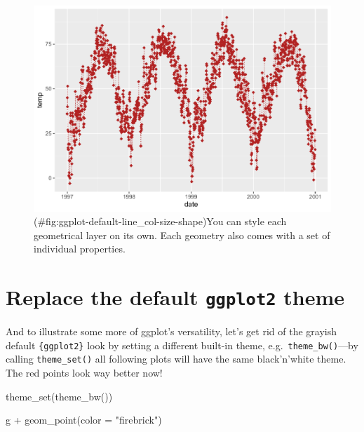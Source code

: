 \documentclass[
]{krantz}
\makeatletter
\newenvironment{Shaded}{\begin{snugshade}}{\end{snugshade}}
\newcommand{\AttributeTok}[1]{\textcolor[rgb]{0.61,0.61,0.61}{#1}}
\newcommand{\FunctionTok}[1]{\textcolor[rgb]{0,0,0}{#1}}
\newcommand{\NormalTok}[1]{#1}
\newcommand{\SpecialCharTok}[1]{\textcolor[rgb]{0,0,0}{#1}}
\newcommand{\StringTok}[1]{\textcolor[rgb]{0.5,0.5,0.5}{#1}}
\newenvironment{kframe}{%
\medskip{}
\setlength{\fboxsep}{.8em}
 \def\at@end@of@kframe{}%
 \ifinner\ifhmode%
  \def\at@end@of@kframe{\end{minipage}}%
  \begin{minipage}{\columnwidth}%
 \fi\fi%
 \def\FrameCommand##1{\hskip\@totalleftmargin \hskip-\fboxsep
 \colorbox{shadecolor}{##1}\hskip-\fboxsep
     \hskip-\linewidth \hskip-\@totalleftmargin \hskip\columnwidth}%
 \MakeFramed {\advance\hsize-\width
   \@totalleftmargin\z@ \linewidth\hsize
   \@setminipage}}%
 {\par\unskip\endMakeFramed%
 \at@end@of@kframe}
\renewenvironment{Shaded}{\begin{kframe}}{\end{kframe}}
\makeatother
\begin{document}
\begin{figure}
\centering
\includegraphics{bookdown_files/figure-latex/ggplot-default-line_col-size-shape-1.pdf}
\caption{(\#fig:ggplot-default-line\_col-size-shape)You can style each geometrical layer on its own. Each geometry also comes with a set of individual properties.}
\end{figure}

\hypertarget{theme}{%
\section{\texorpdfstring{Replace the default \texttt{ggplot2} theme}{Replace the default ggplot2 theme}}\label{theme}}

And to illustrate some more of ggplot's versatility, let's get rid of the grayish default \texttt{\{ggplot2\}} look by setting a different built-in theme, e.g.~\texttt{theme\_bw()}---by calling \texttt{theme\_set()} all following plots will have the same black'n'white theme. The red points look way better now!

\begin{Shaded}
\begin{Highlighting}[]
\FunctionTok{theme\_set}\NormalTok{(}\FunctionTok{theme\_bw}\NormalTok{())}

\NormalTok{g }\SpecialCharTok{+} \FunctionTok{geom\_point}\NormalTok{(}\AttributeTok{color =} \StringTok{"firebrick"}\NormalTok{)}
\end{Highlighting}
\end{Shaded}
\end{document}
